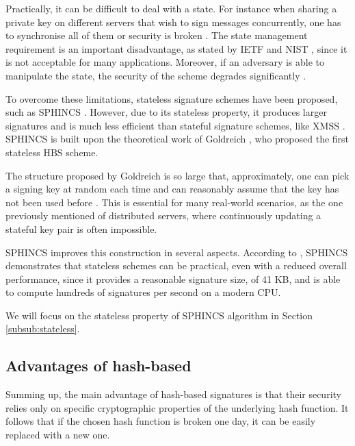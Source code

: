 \documentclass[a4paper,12pt]{article}
\begin{document}
Practically, it can be difficult to deal with a state. For instance when sharing a private key on different servers that wish to sign messages concurrently, one has to synchronise all of them or security is broken \cite{4_wings}.
The state management requirement is an important disadvantage, as stated by IETF and NIST \cite{5_postquantum_signature_usecase}, since it is not acceptable for many applications.
Moreover, if an adversary is able to manipulate the state, the security of the scheme degrades significantly \cite{12_faultinjection}.

To overcome these limitations, stateless signature schemes have been proposed, such as SPHINCS \cite{7_hashbased}. However, due to its stateless property, it produces larger signatures and is much less efficient than stateful signature schemes, like XMSS \cite{5_postquantum_signature_usecase}.
SPHINCS is built upon the theoretical work of Goldreich \cite{3_SPHINCS_secondpaper}, who proposed the first stateless HBS scheme.

The structure proposed by Goldreich is so large that, approximately, one can pick a signing key at random each time and can reasonably assume that the key has not been used before \cite{3_SPHINCS_secondpaper}. This is essential for many real-world scenarios, as the one previously mentioned of distributed servers, where continuously updating a stateful key pair is often impossible. 

SPHINCS improves this construction in several aspects. According to \cite{4_wings}, SPHINCS demonstrates that stateless schemes can be practical, even with a reduced overall performance, since it provides a reasonable signature size, of 41 KB, and is able to compute hundreds of signatures per second on a modern CPU.

We will focus on the stateless property of SPHINCS algorithm in Section \ref{subsub:stateless}.

\subsection{Advantages of hash-based}
\label{sub:advantages}

Summing up, the main advantage of hash-based signatures is that their security relies only on specific cryptographic properties of the underlying hash function. It follows that if the chosen hash function is broken one day, it can be easily replaced with a new one.
\end{document}
